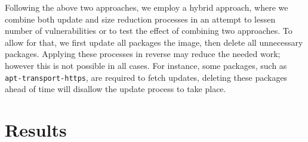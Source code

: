 \documentclass[a4paper,num-refs]{oup-contemporary}
\begin{document}
Following the above two approaches, we employ a hybrid approach, where
we combine both update and size reduction processes in an attempt to
lessen number of vulnerabilities or to test the effect of
combining two approaches. To allow for that, we first update all packages
the image, then delete all unnecessary packages. Applying these processes in reverse
may reduce the needed work; however this is not possible in all cases. For instance,
some packages, such as \texttt{apt-transport-https}, are required to fetch updates, deleting these packages
ahead of time will disallow the update process to take place.
%
\section{Results}
\end{document}
